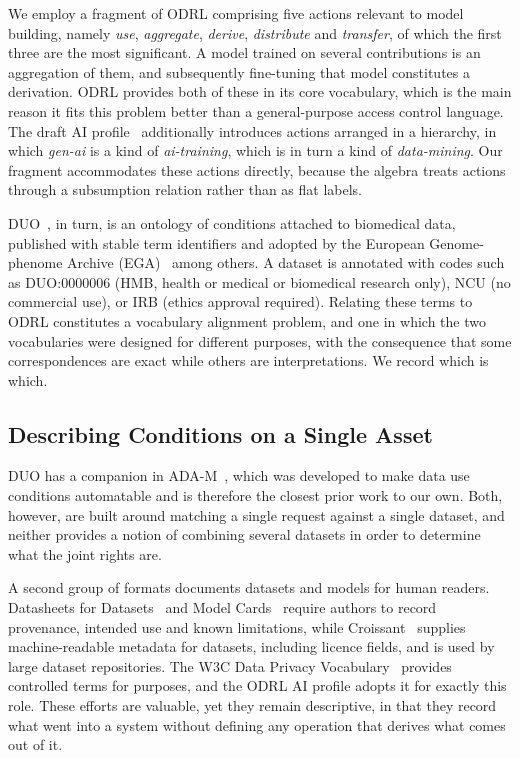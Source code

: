 \documentclass[sigconf,anonymous,review]{acmart}
\begin{document}
We employ a fragment of ODRL comprising five actions relevant to model building,
namely \emph{use}, \emph{aggregate}, \emph{derive}, \emph{distribute} and
\emph{transfer}, of which the first three are the most significant. A model
trained on several contributions is an aggregation of them, and subsequently
fine-tuning that model constitutes a derivation. ODRL provides both of these in
its core vocabulary, which is the main reason it fits this problem better than a
general-purpose access control language. The draft AI profile~\cite{odrl-ai}
additionally introduces actions arranged in a hierarchy, in which \emph{gen-ai}
is a kind of \emph{ai-training}, which is in turn a kind of \emph{data-mining}.
Our fragment accommodates these actions directly, because the algebra treats
actions through a subsumption relation rather than as flat labels.

DUO~\cite{duo}, in turn, is an ontology of conditions attached to biomedical
data, published with stable term identifiers and adopted by the European
Genome-phenome Archive (EGA)~\cite{ega} among others. A dataset is annotated with
codes such as DUO:0000006 (HMB, health or medical or biomedical research only),
NCU (no commercial use), or IRB (ethics approval required). Relating these terms
to ODRL constitutes a vocabulary alignment problem, and one in which the two
vocabularies were designed for different purposes, with the consequence that some
correspondences are exact while others are interpretations. We record which is
which.

\subsection{Describing Conditions on a Single Asset}

DUO has a companion in ADA-M~\cite{adam}, which was developed to make data use
conditions automatable and is therefore the closest prior work to our own.
Both, however, are built around matching a single request against a single
dataset, and neither provides a notion of combining several datasets in order to
determine what the joint rights are.

A second group of formats documents datasets and models for human readers.
Datasheets for Datasets~\cite{datasheets} and Model Cards~\cite{modelcards}
require authors to record provenance, intended use and known limitations, while
Croissant~\cite{croissant} supplies machine-readable metadata for datasets,
including licence fields, and is used by large dataset repositories. The W3C Data
Privacy Vocabulary~\cite{dpv} provides controlled terms for purposes, and the
ODRL AI profile adopts it for exactly this role. These efforts are valuable, yet
they remain descriptive, in that they record what went into a system without
defining any operation that derives what comes out of it.
\end{document}
